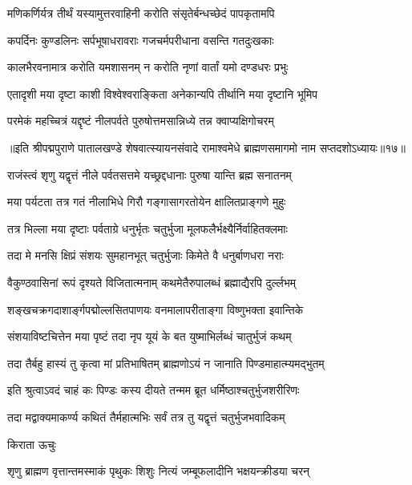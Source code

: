 \twolineshloka
{मणिकर्णिर्यत्र तीर्थं यस्यामुत्तरवाहिनी}
{करोति संसृतेर्बन्धच्छेदं पापकृतामपि}%

\twolineshloka
{कपर्दिनः कुण्डलिनः सर्पभूषाधरावराः}
{गजचर्मपरीधाना वसन्ति गतदुःखकाः}%

\twolineshloka
{कालभैरवनामात्र करोति यमशासनम्}
{न करोति नृणां वार्तां यमो दण्डधरः प्रभुः}%

\twolineshloka
{एतादृशी मया दृष्टा काशी विश्वेश्वराङ्किता}
{अनेकान्यपि तीर्थानि मया दृष्टानि भूमिप}%

\twolineshloka
{परमेकं महच्चित्रं यद्दृष्टं नीलपर्वते}
{पुरुषोत्तमसान्निध्ये तन्न क्वाप्यक्षिगोचरम्}%

॥इति श्रीपद्मपुराणे पातालखण्डे शेषवात्स्यायनसंवादे रामाश्वमेधे ब्राह्मणसमागमो नाम सप्तदशोऽध्यायः॥१७॥



\twolineshloka
{राजंस्त्वं शृणु यद्वृत्तं नीले पर्वतसत्तमे}
{यच्छ्रद्दधानाः पुरुषा यान्ति ब्रह्म सनातनम्}%

\twolineshloka
{मया पर्यटता तत्र गतं नीलाभिधे गिरौ}
{गङ्गासागरतोयेन क्षालितप्राङ्गणे मुहुः}%

\twolineshloka
{तत्र भिल्ला मया दृष्टाः पर्वताग्रे धनुर्भृतः}
{चतुर्भुजा मूलफलैर्भक्ष्यैर्निर्वाहितक्लमाः}%

\twolineshloka
{तदा मे मनसि क्षिप्रं संशयः सुमहानभूत्}
{चतुर्भुजाः किमेते वै धनुर्बाणधरा नराः}%

\twolineshloka
{वैकुण्ठवासिनां रूपं दृश्यते विजितात्मनाम्}
{कथमेतैरुपालब्धं ब्रह्माद्यैरपि दुर्ल्लभम्}%

\twolineshloka
{शङ्खचक्रगदाशार्ङ्गपद्मोल्लसितपाणयः}
{वनमालापरीताङ्गा विष्णुभक्ता इवान्तिके}%

\twolineshloka
{संशयाविष्टचित्तेन मया पृष्टं तदा नृप}
{यूयं के बत युष्माभिर्लब्धं चातुर्भुजं कथम्}%

\twolineshloka
{तदा तैर्बहु हास्यं तु कृत्वा मां प्रतिभाषितम्}
{ब्राह्मणोऽयं न जानाति पिण्डमाहात्म्यमद्भुतम्}%

\twolineshloka
{इति श्रुत्वाऽवदं चाहं कः पिण्डः कस्य दीयते}
{तन्मम ब्रूत धर्मिष्ठाश्चतुर्भुजशरीरिणः}%

\twolineshloka
{तदा मद्वाक्यमाकर्ण्य कथितं तैर्महात्मभिः}
{सर्वं तत्र तु यद्वृत्तं चतुर्भुजभवादिकम्}%

किराता ऊचुः

\twolineshloka
{शृणु ब्राह्मण वृत्तान्तमस्माकं पृथुकः शिशुः}
{नित्यं जम्बूफलादीनि भक्षयन्क्रीडया चरन्}%

